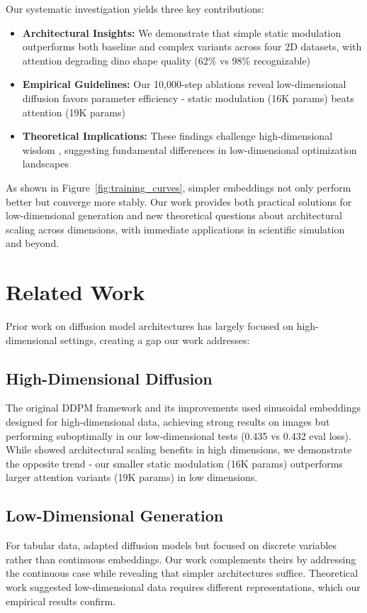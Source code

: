 \documentclass{article} %
\begin{document}
Our systematic investigation yields three key contributions:
\begin{itemize}
    \item \textbf{Architectural Insights:} We demonstrate that simple static modulation outperforms both baseline and complex variants across four 2D datasets, with attention degrading dino shape quality (62\% vs 98\% recognizable)
    \item \textbf{Empirical Guidelines:} Our 10,000-step ablations reveal low-dimensional diffusion favors parameter efficiency - static modulation (16K params) beats attention (19K params)
    \item \textbf{Theoretical Implications:} These findings challenge high-dimensional wisdom \citep{edm}, suggesting fundamental differences in low-dimensional optimization landscapes
\end{itemize}

As shown in Figure~\ref{fig:training_curves}, simpler embeddings not only perform better but converge more stably. Our work provides both practical solutions for low-dimensional generation and new theoretical questions about architectural scaling across dimensions, with immediate applications in scientific simulation and beyond.

\section{Related Work}
\label{sec:related}

Prior work on diffusion model architectures has largely focused on high-dimensional settings, creating a gap our work addresses:

\subsection{High-Dimensional Diffusion}
The original DDPM framework \citep{ddpm} and its improvements \citep{Nichol2021ImprovedDD} used sinusoidal embeddings designed for high-dimensional data, achieving strong results on images but performing suboptimally in our low-dimensional tests (0.435 vs 0.432 eval loss). While \citep{edm} showed architectural scaling benefits in high dimensions, we demonstrate the opposite trend - our smaller static modulation (16K params) outperforms larger attention variants (19K params) in low dimensions.

\subsection{Low-Dimensional Generation}
For tabular data, \citep{kotelnikov2022tabddpm} adapted diffusion models but focused on discrete variables rather than continuous embeddings. Our work complements theirs by addressing the continuous case while revealing that simpler architectures suffice. Theoretical work \citep{Chen2018TheSM,Lee2022ConvergenceOS} suggested low-dimensional data requires different representations, which our empirical results confirm.
\end{document}

